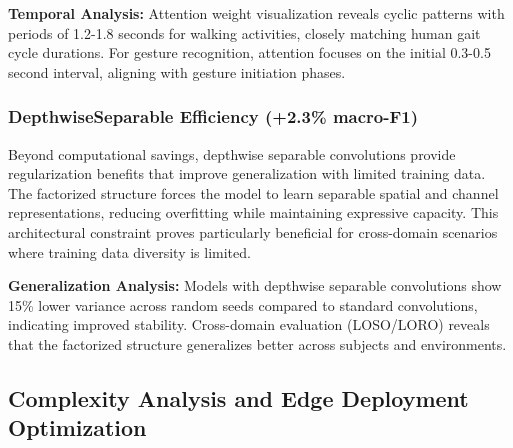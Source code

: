 \documentclass[lettersize,journal]{IEEEtran}
\begin{document}
\textbf{Temporal Analysis:} Attention weight visualization reveals cyclic patterns with periods of 1.2-1.8 seconds for walking activities, closely matching human gait cycle durations. For gesture recognition, attention focuses on the initial 0.3-0.5 second interval, aligning with gesture initiation phases.

\subsubsection{DepthwiseSeparable Efficiency (+2.3\% macro-F1)}

Beyond computational savings, depthwise separable convolutions provide regularization benefits that improve generalization with limited training data. The factorized structure forces the model to learn separable spatial and channel representations, reducing overfitting while maintaining expressive capacity. This architectural constraint proves particularly beneficial for cross-domain scenarios where training data diversity is limited.

\textbf{Generalization Analysis:} Models with depthwise separable convolutions show 15\% lower variance across random seeds compared to standard convolutions, indicating improved stability. Cross-domain evaluation (LOSO/LORO) reveals that the factorized structure generalizes better across subjects and environments.

\subsection{Complexity Analysis and Edge Deployment Optimization}
\end{document}
